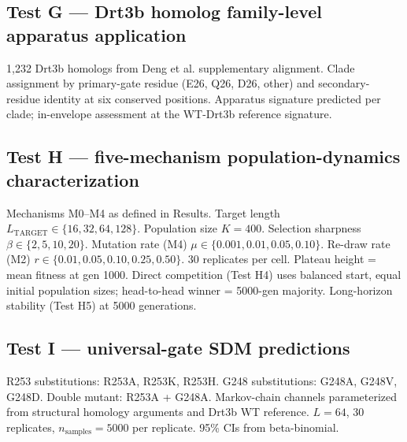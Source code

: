 \documentclass[aps,prx,reprint,amsmath,amssymb,floatfix,superscriptaddress,nofootinbib]{revtex4-2}
\theoremstyle{plain-thm}
\theoremstyle{definition-thm}
\begin{document}
\subsection{Test G --- Drt3b homolog family-level apparatus application}

1{,}232 Drt3b homologs from Deng et al. supplementary alignment. Clade assignment by primary-gate residue (E26, Q26, D26, other) and secondary-residue identity at six conserved positions. Apparatus signature predicted per clade; in-envelope assessment at the WT-Drt3b reference signature.

\subsection{Test H --- five-mechanism population-dynamics characterization}

Mechanisms M0--M4 as defined in Results. Target length $L_{\mathrm{TARGET}} \in \{16, 32, 64, 128\}$. Population size $K = 400$. Selection sharpness $\beta \in \{2, 5, 10, 20\}$. Mutation rate (M4) $\mu \in \{0.001, 0.01, 0.05, 0.10\}$. Re-draw rate (M2) $r \in \{0.01, 0.05, 0.10, 0.25, 0.50\}$. 30 replicates per cell. Plateau height = mean fitness at gen 1000. Direct competition (Test H4) uses balanced start, equal initial population sizes; head-to-head winner = 5000-gen majority. Long-horizon stability (Test H5) at 5000 generations.

\subsection{Test I --- universal-gate SDM predictions}

R253 substitutions: R253A, R253K, R253H. G248 substitutions: G248A, G248V, G248D. Double mutant: R253A + G248A. Markov-chain channels parameterized from structural homology arguments and Drt3b WT reference. $L = 64$, 30 replicates, $n_{\mathrm{samples}} = 5000$ per replicate. 95\% CIs from beta-binomial.
\end{document}

